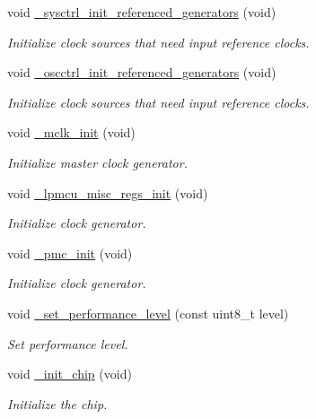 \begin{DoxyCompactItemize}
void \hyperlink{group___h_p_l_ga3e5e49081818470968093b6e3597ab5f}{\+\_\+sysctrl\+\_\+init\+\_\+referenced\+\_\+generators} (void)
\begin{DoxyCompactList}\small\item\em Initialize clock sources that need input reference clocks. \end{DoxyCompactList}\item 
void \hyperlink{group___h_p_l_ga2e4746bc23999fe1dc7c02aa4e167bfb}{\+\_\+oscctrl\+\_\+init\+\_\+referenced\+\_\+generators} (void)
\begin{DoxyCompactList}\small\item\em Initialize clock sources that need input reference clocks. \end{DoxyCompactList}\item 
void \hyperlink{group___h_p_l_ga840b5c5290dd94e858db4d89259ba3f4}{\+\_\+mclk\+\_\+init} (void)
\begin{DoxyCompactList}\small\item\em Initialize master clock generator. \end{DoxyCompactList}\item 
void \hyperlink{group___h_p_l_ga3dd85007c9fdeed2ffe1166a33dd6519}{\+\_\+lpmcu\+\_\+misc\+\_\+regs\+\_\+init} (void)
\begin{DoxyCompactList}\small\item\em Initialize clock generator. \end{DoxyCompactList}\item 
void \hyperlink{group___h_p_l_ga580e99e942064901ed0f02f5d8789c7a}{\+\_\+pmc\+\_\+init} (void)
\begin{DoxyCompactList}\small\item\em Initialize clock generator. \end{DoxyCompactList}\item 
void \hyperlink{group___h_p_l_ga1668b7fc690ec56e1f3d54d9f3b8e5f2}{\+\_\+set\+\_\+performance\+\_\+level} (const uint8\+\_\+t level)
\begin{DoxyCompactList}\small\item\em Set performance level. \end{DoxyCompactList}\item 
void \hyperlink{group___h_p_l_gac10942d1aec3f0ce14117119db5e9555}{\+\_\+init\+\_\+chip} (void)
\begin{DoxyCompactList}\small\item\em Initialize the chip. \end{DoxyCompactList}\end{DoxyCompactItemize}
